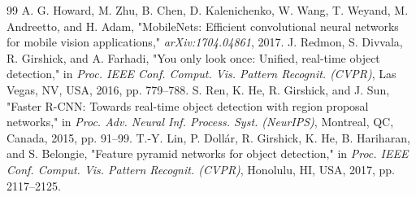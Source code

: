\documentclass[conference]{IEEEtran}
\begin{document}
\begin{thebibliography}{99}
A. G. Howard, M. Zhu, B. Chen, D. Kalenichenko, W. Wang, T. Weyand, M. Andreetto, and H. Adam, "MobileNets: Efficient convolutional neural networks for mobile vision applications," \textit{arXiv:1704.04861}, 2017.
J. Redmon, S. Divvala, R. Girshick, and A. Farhadi, "You only look once: Unified, real-time object detection," in \textit{Proc. IEEE Conf. Comput. Vis. Pattern Recognit. (CVPR)}, Las Vegas, NV, USA, 2016, pp. 779–788.
S. Ren, K. He, R. Girshick, and J. Sun, "Faster R-CNN: Towards real-time object detection with region proposal networks," in \textit{Proc. Adv. Neural Inf. Process. Syst. (NeurIPS)}, Montreal, QC, Canada, 2015, pp. 91–99.
T.-Y. Lin, P. Dollár, R. Girshick, K. He, B. Hariharan, and S. Belongie, "Feature pyramid networks for object detection," in \textit{Proc. IEEE Conf. Comput. Vis. Pattern Recognit. (CVPR)}, Honolulu, HI, USA, 2017, pp. 2117–2125.
\end{thebibliography}
\end{document}
